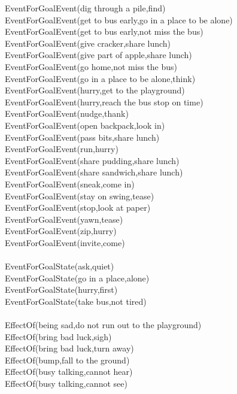 \begin{multicols}{2}
\begin{footnotesize}
EventForGoalEvent(dig through a pile,find) \\
EventForGoalEvent(get to bus early,go in a place to be alone) \\
EventForGoalEvent(get to bus early,not miss the bus) \\
EventForGoalEvent(give cracker,share lunch) \\
EventForGoalEvent(give part of apple,share lunch) \\
EventForGoalEvent(go home,not miss the bus) \\
EventForGoalEvent(go in a place to be alone,think) \\
EventForGoalEvent(hurry,get to the playground) \\
EventForGoalEvent(hurry,reach the bus stop on time) \\
EventForGoalEvent(nudge,thank) \\
EventForGoalEvent(open backpack,look in) \\
EventForGoalEvent(pass bits,share lunch) \\
EventForGoalEvent(run,hurry) \\
EventForGoalEvent(share pudding,share lunch) \\
EventForGoalEvent(share sandwich,share lunch) \\
EventForGoalEvent(sneak,come in) \\
EventForGoalEvent(stay on swing,tease) \\
EventForGoalEvent(stop,look at paper) \\
EventForGoalEvent(yawn,tease) \\
EventForGoalEvent(zip,hurry) \\
EventForGoalEvent(invite,come) \\
~\\
EventForGoalState(ask,quiet) \\
EventForGoalState(go in a place,alone) \\
EventForGoalState(hurry,first) \\
EventForGoalState(take bus,not tired) \\
~\\
EffectOf(being sad,do not run out to the playground) \\
EffectOf(bring bad luck,sigh) \\
EffectOf(bring bad luck,turn away) \\
EffectOf(bump,fall to the ground) \\
EffectOf(busy talking,cannot hear) \\
EffectOf(busy talking,cannot see) \\

\end{footnotesize}
\end{multicols}
